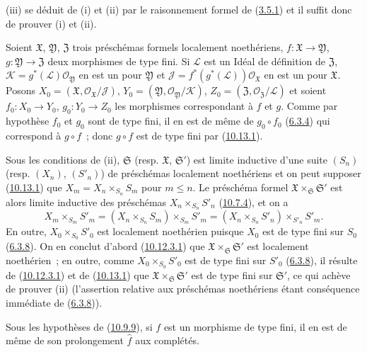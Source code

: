 (iii) se déduit de (i) et (ii) par le raisonnement formel de
(\hyperref[I.3.5.1-fr]{3.5.1}) et il suffit donc de prouver (i) et (ii).

Soient $\mathfrak{X}$, $\mathfrak{Y}$, $\mathfrak{Z}$ trois préschémas
formels localement noethériens, $f:\mathfrak{X}\to\mathfrak{Y}$,
$g:\mathfrak{Y}\to\mathfrak{Z}$ deux morphismes de type fini. Si
$\mathscr{L}$ est un Idéal de définition de $\mathfrak{Z}$,
$\mathscr{K}=g^*(\mathscr{L})\mathscr{O}_{\mathfrak{Y}}$ en est un pour
$\mathfrak{Y}$ et
$\mathscr{J}=f^*(g^*(\mathscr{L}))\mathscr{O}_{\mathfrak{X}}$ en est un
pour $\mathfrak{X}$. Posons
$X_0=(\mathfrak{X},\mathscr{O}_{\mathfrak{X}}/\mathscr{J})$,
$Y_0=(\mathfrak{Y},\mathscr{O}_{\mathfrak{Y}}/\mathscr{K})$,
$Z_0=(\mathfrak{Z},\mathscr{O}_{\mathfrak{Z}}/\mathscr{L})$ et soient
$f_0:X_0\to Y_0$, $g_0:Y_0\to Z_0$ les morphismes correspondant à $f$ et
$g$. Comme par hypothèse $f_0$ et $g_0$ sont de type fini, il en est de même
de $g_0\circ f_0$ (\hyperref[I.6.3.4-fr]{6.3.4}) qui correspond à
$g\circ f$~; donc $g\circ f$ est de type fini par
(\hyperref[I.10.13.1-fr]{10.13.1}).

Sous les conditions de (ii), $\mathfrak{S}$ (resp. $\mathfrak{X}$,
$\mathfrak{S}'$) est limite inductive d'une suite $(S_n)$ (resp. $(X_n)$,
$(S'_n)$) de préschémas localement noethériens et on peut supposer
(\hyperref[I.10.13.1-fr]{10.13.1}) que
$X_m=X_n\times_{S_n}S_m$ pour $m\leq n$. Le préschéma formel
$\mathfrak{X}\times_{\mathfrak{S}}\mathfrak{S}'$ est alors limite inductive
des préschémas $X_n\times_{S_n}S'_n$
(\hyperref[I.10.7.4-fr]{10.7.4}), et on a
\[
  X_m\times_{S_m}S'_m
  =(X_n\times_{S_n}S_m)\times_{S_m}S'_m
  =(X_n\times_{S_n}S'_n)\times_{S'_n}S'_m.
\]
En outre, $X_0\times_{S_0}S'_0$ est localement noethérien puisque $X_0$
est de type fini sur $S_0$ (\hyperref[I.6.3.8-fr]{6.3.8}). On en conclut
d'abord (\hyperref[I.10.12.3.1-fr]{10.12.3.1}) que
$\mathfrak{X}\times_{\mathfrak{S}}\mathfrak{S}'$ est localement
noethérien~; en outre, comme $X_0\times_{S_0}S'_0$ est de type fini sur
$S'_0$ (\hyperref[I.6.3.8-fr]{6.3.8}), il résulte de
(\hyperref[I.10.12.3.1-fr]{10.12.3.1}) et de
(\hyperref[I.10.13.1-fr]{10.13.1}) que
$\mathfrak{X}\times_{\mathfrak{S}}\mathfrak{S}'$ est de type fini sur
$\mathfrak{S}'$, ce qui achève de prouver (ii) (l'assertion relative aux
préschémas noethériens étant conséquence immédiate de
(\hyperref[I.6.3.8-fr]{6.3.8})).

\begin{corollary}[10.13.6]
\label{I.10.13.6-fr}
Sous les hypothèses de \textup{(\hyperref[I.10.9.9-fr]{10.9.9})}, si $f$ est un
morphisme de type fini, il en est de même de son prolongement $\widehat f$
aux complétés.
\end{corollary}


